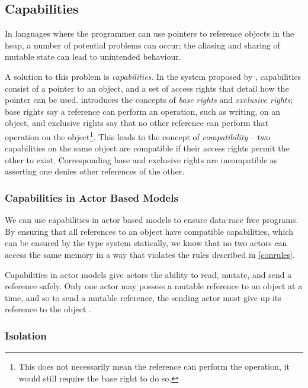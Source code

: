 \subsection{Capabilities}

In languages where the programmer can use pointers to reference objects in the heap, a number of potential problems can occur; the aliasing and sharing of mutable state can lead to unintended behaviour.

A solution to this problem is \textit{capabilities}. In the system proposed by \cite{Boyland2001}, capabilities consist of a pointer to an object, and a set of access rights that detail how the pointer can be used. \cite{Boyland2001} introduces the concepts of \textit{base rights} and \textit{exclusive rights}; base rights say a reference can perform an operation, such as writing, on an object, and exclusive rights say that no other reference can perform that operation on the object\footnote{This does not necessarily mean the reference can perform the operation, it would still require the base right to do so.}. This leads to the concept of \textit{compatibility} -- two capabilities on the same object are compatible if their access rights permit the other to exist. Corresponding base and exclusive rights are incompatible as asserting one denies other references of the other.

\subsubsection{Capabilities in Actor Based Models}

We can use capabilities in actor based models to ensure data-race free programs. By ensuring that all references to an object have compatible capabilities, which can be ensured by the type system statically, we know that no two actors can access the same memory in a way that violates the rules described in \ref{conrules}.

Capabilities in actor models give actors the ability to read, mutate, and send a reference safely. Only one actor may possess a mutable reference to an object at a time, and so to send a mutable reference, the sending actor must give up its reference to the object \cite{Srinivasana}.



\subsubsection{Isolation} \label{isolation}

